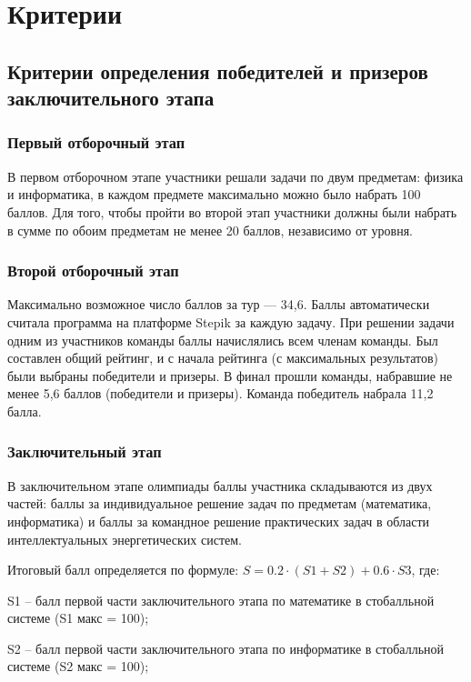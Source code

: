 \part{Критерии}

\chapter{Критерии определения победителей и призеров заключительного этапа}

\section{Первый отборочный этап}

В первом отборочном этапе участники решали задачи по двум предметам: физика и информатика, в каждом предмете максимально можно было набрать 100 баллов. Для того, чтобы пройти во второй этап участники должны были набрать в сумме по обоим предметам не менее 20 баллов, независимо от уровня.

\section{Второй отборочный этап}

Максимально возможное число баллов за тур — 34,6. Баллы автоматически считала программа на платформе Stepik за каждую задачу. При решении задачи одним из участников команды баллы начислялись всем членам команды. Был составлен общий рейтинг, и с начала рейтинга (с максимальных результатов) были выбраны победители и призеры. В финал прошли команды, набравшие не менее 5,6 баллов (победители и призеры). Команда победитель набрала 11,2 балла.   

\section{Заключительный этап}

В заключительном этапе олимпиады баллы участника складываются из двух частей: баллы за индивидуальное решение задач по предметам (математика, информатика) и баллы за командное решение практических задач в области интеллектуальных энергетических систем.

Итоговый балл определяется по формуле: $S = 0.2 \cdot  (S1+S2) + 0.6 \cdot S3$, где:

S1 – балл первой части заключительного этапа по математике в стобалльной системе (S1 макс = 100);

S2 – балл первой части заключительного этапа по информатике в стобалльной системе (S2 макс = 100);

